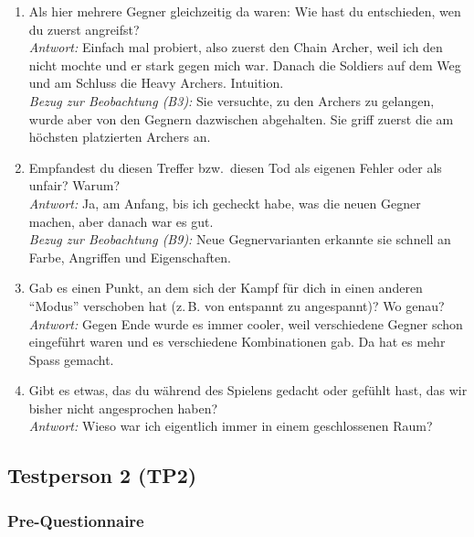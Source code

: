 \documentclass[../Main.tex]{subfiles}
\begin{document}
\begin{enumerate}[label=\textbf{I\arabic*}, leftmargin=1.5cm, itemsep=1em]
\item Als hier mehrere Gegner gleichzeitig da waren: Wie hast du entschieden, wen du zuerst angreifst? \\
    \textit{Antwort:} Einfach mal probiert, also zuerst den Chain Archer, weil ich den nicht mochte und er stark gegen mich war. Danach die Soldiers auf dem Weg und am Schluss die Heavy Archers. Intuition. \\
    \textit{Bezug zur Beobachtung (B3):} Sie versuchte, zu den Archers zu gelangen, wurde aber von den Gegnern dazwischen abgehalten. Sie griff zuerst die am höchsten platzierten Archers an.

\item Empfandest du diesen Treffer bzw.\ diesen Tod als eigenen Fehler oder als unfair? Warum? \\
    \textit{Antwort:} Ja, am Anfang, bis ich gecheckt habe, was die neuen Gegner machen, aber danach war es gut. \\
    \textit{Bezug zur Beobachtung (B9):} Neue Gegnervarianten erkannte sie schnell an Farbe, Angriffen und Eigenschaften.

\item Gab es einen Punkt, an dem sich der Kampf für dich in einen anderen \enquote{Modus} verschoben hat (z.\,B. von entspannt zu angespannt)? Wo genau? \\
    \textit{Antwort:} Gegen Ende wurde es immer cooler, weil verschiedene Gegner schon eingeführt waren und es verschiedene Kombinationen gab. Da hat es mehr Spass gemacht.

\item Gibt es etwas, das du während des Spielens gedacht oder gefühlt hast, das wir bisher nicht angesprochen haben? \\
    \textit{Antwort:} Wieso war ich eigentlich immer in einem geschlossenen Raum?
\end{enumerate}

\subsection{Testperson 2 (TP2)}

\subsubsection{Pre-Questionnaire}
\end{document}
